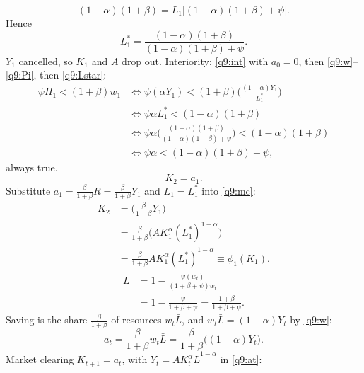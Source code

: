 \begin{sol}
\[
(1-\alpha)(1+\beta)=L_1\big[(1-\alpha)(1+\beta)+\psi\big].
\]
Hence
\begin{equation}
L_1^\ast=\frac{(1-\alpha)(1+\beta)}{(1-\alpha)(1+\beta)+\psi}. \label{q9:Lstar}
\end{equation}
$Y_1$ cancelled, so $K_1$ and $A$ drop out. Interiority: \eqref{q9:int} with $a_0=0$, then \eqref{q9:w}--\eqref{q9:Pi}, then
\eqref{q9:Lstar}:
\begin{align*}
\psi\Pi_1<(1+\beta)w_1 &\iff \psi(\alpha Y_1)<(1+\beta)\Big(\frac{(1-\alpha)Y_1}{L_1^\ast}\Big)\\
&\iff \psi\alpha L_1^\ast<(1-\alpha)(1+\beta)\\
&\iff \psi\alpha\Big(\frac{(1-\alpha)(1+\beta)}{(1-\alpha)(1+\beta)+\psi}\Big)<(1-\alpha)(1+\beta)\\
&\iff \psi\alpha<(1-\alpha)(1+\beta)+\psi,
\end{align*}
always true.
\begin{equation}
K_2=a_1. \label{q9:mc}
\end{equation}
Substitute $a_1=\frac{\beta}{1+\beta}R=\frac{\beta}{1+\beta}Y_1$ and $L_1=L_1^\ast$ into \eqref{q9:mc}:
\begin{align}
K_2 &= \Big(\frac{\beta}{1+\beta}Y_1\Big)\nonumber\\
&= \frac{\beta}{1+\beta}\big(AK_1^\alpha(L_1^\ast)^{1-\alpha}\big)\nonumber\\
&= \frac{\beta}{1+\beta}AK_1^\alpha(L_1^\ast)^{1-\alpha}\equiv\phi_1(K_1). \label{q9:phi1}
\end{align}
\begin{align}
\bar L &= 1-\frac{\psi(w_t)}{(1+\beta+\psi)w_t}\nonumber\\
&= 1-\frac{\psi}{1+\beta+\psi}=\frac{1+\beta}{1+\beta+\psi}. \label{q9:Lbar}
\end{align}
Saving is the share $\frac{\beta}{1+\beta}$ of resources $w_t\bar L$, and $w_t\bar L=(1-\alpha)Y_t$ by \eqref{q9:w}:
\begin{equation}
a_t=\frac{\beta}{1+\beta}w_t\bar L=\frac{\beta}{1+\beta}\big((1-\alpha)Y_t\big). \label{q9:at}
\end{equation}
Market clearing $K_{t+1}=a_t$, with $Y_t=AK_t^\alpha\bar L^{1-\alpha}$ in \eqref{q9:at}:
\begin{align}

\end{align}
\end{sol}
